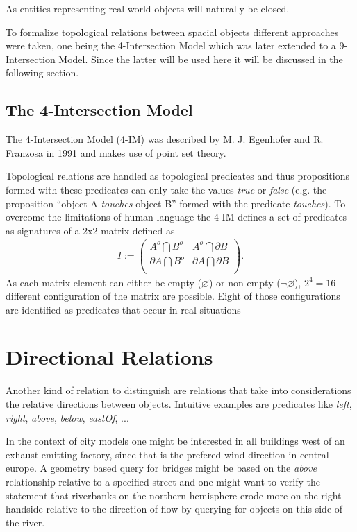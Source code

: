 \documentclass[paper=a4, fontsize=11pt]{scrartcl} %
\numberwithin{equation}{section} %
\numberwithin{figure}{section} %
\numberwithin{table}{section} %
\begin{document}
As entities representing real world objects will naturally be closed.  

To formalize topological relations between spacial objects different approaches were taken, one being the 4-Intersection Model which was later extended to a 9-Intersection Model. Since the latter will be used here it will be discussed in the following section.

\subsection{The 4-Intersection Model}
The 4-Intersection Model (4-IM) was described by M. J. Egenhofer and R. Franzosa in 1991 \cite{Egenhofer:1991:IJGIS} and makes use of point set theory. 


Topological relations are handled as topological predicates and thus propositions formed with these predicates can only take the values \emph{true} or \emph{false} (e.g. the proposition ``object A \emph{touches} object B'' formed with the predicate \emph{touches}). 
To overcome the limitations of human language the 4-IM defines a set of predicates as signatures of a 2x2 matrix defined as 
\begin{align*}
  I := \begin{pmatrix}
    A^{o} \bigcap B^{o}        & A^{o} \bigcap \partial B  \\
    \partial A \bigcap B^{o}  & \partial A \bigcap \partial B  \\
  \end{pmatrix}.
\end{align*}
As each matrix element can either be empty ($\varnothing$) or non-empty ($\neg\varnothing$), $2^4 = 16$ different configuration of the matrix are possible. Eight of those configurations are identified as predicates that occur in real situations 

\section{Directional Relations}

Another kind of relation to distinguish are relations that take into considerations the relative directions between objects. Intuitive examples are predicates like \emph{left}, \emph{right}, \emph{above}, \emph{below}, \emph{eastOf}, ...

In the context of city models one might be interested in all buildings west of an exhaust emitting factory, since that is the prefered wind direction in central europe. A geometry based query for bridges might be based on the \emph{above} relationship relative to a specified street and one might want to verify the statement that riverbanks on the northern hemisphere erode more on the right handside relative to the direction of flow by querying for objects on this side of the river. 
\end{document}
